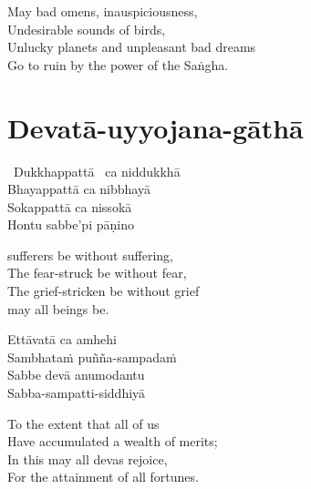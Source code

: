 \begin{english-verses}
  May bad omens, inauspiciousness,\\
  Undesirable sounds of birds,\\
  Unlucky planets and unpleasant bad dreams\\
  Go to ruin by the power of the Saṅgha.
\end{english-verses}

\suttaRef{[Trad]}

\section{Devatā-uyyojana-gāthā}
\label{devata-uyyojana-gatha}

\begin{pali-hangtogether}
  \anglebracketleft\ \hspace{-0.5mm}Dukkhappattā \hspace{-0.5mm}\anglebracketright\ ca niddukkhā\\
  Bhayappattā ca nibbhayā\\
  Sokappattā ca nissokā\\
  Hontu sabbe'pi pāṇino
\end{pali-hangtogether}

\begin{english-verses}
  [May] sufferers be without suffering,\\
  The fear-struck be without fear,\\
  The grief-stricken be without grief\\\relax
  [Thus] may all beings be.
\end{english-verses}

\begin{pali-hang-continued}
  Ettāvatā ca amhehi\\
  Sambhataṁ puñña-sampadaṁ\\
  Sabbe devā anumodantu\makeatletter\hyperlink{endnote128-appendix}\makeatother\\
  Sabba-sampatti-siddhiyā
\end{pali-hang-continued}

\begin{english-verses}
  To the extent that all of us\\
  Have accumulated a wealth of merits;\\
  In this may all devas rejoice,\\
  For the attainment of all fortunes.
\end{english-verses}

